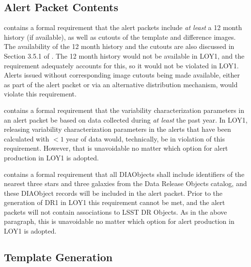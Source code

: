 \documentclass[DM,toc]{lsstdoc}
\begin{document}
\subsection{Alert Packet Contents}\label{ssec:req_apc}

 contains a formal requirement that the alert packets include {\em at least} a 12 month history (if available), as well as cutouts of the template and difference images.
The availability of the 12 month history and the cutouts are also discussed in Section 3.5.1 of .
The 12 month history would not be available in LOY1, and the requirement adequately accounts for this, so it would not be violated in LOY1.
Alerts issued without corresponding image cutouts being made available, either as part of the alert packet or via an alternative distribution mechanism, would violate this requirement.

 contains a formal requirement that the variability characterization parameters in an alert packet be based on data collected during {\em at least} the past year.
In LOY1, releasing variability characterization parameters in the alerts that have been calculated with $<1$ year of data would, technically, be in violation of this requirement.
However, that is unavoidable no matter which option for alert production in LOY1 is adopted.

 contains a formal requirement that all DIAObjects shall include identifiers of the nearest three stars and three galaxies from the Data Release Objects catalog, and these DIAObject records will be included in the alert packet.
Prior to the generation of DR1 in LOY1 this requirement cannot be met, and the alert packets will not contain associations to LSST DR Objects.
As in the above paragraph, this is unavoidable no matter which option for alert production in LOY1 is adopted.

\subsection{Template Generation}\label{ssec:req_temp}
\end{document}
